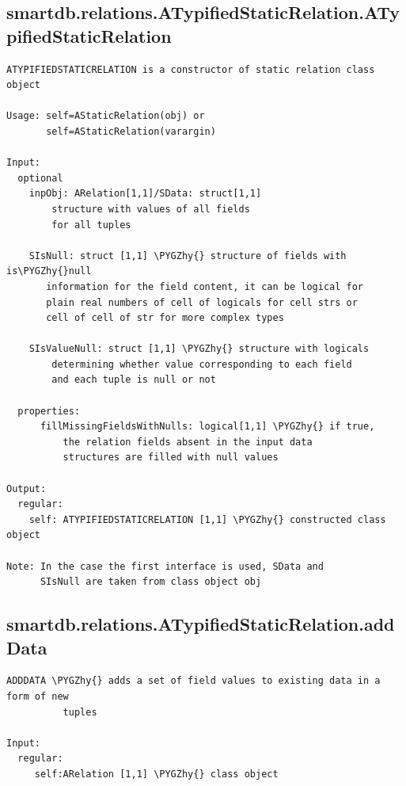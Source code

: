 \documentclass[letterpaper,10pt,english]{sphinxmanual}
\def\PYGZhy{\char`\-}
\begin{document}
\subsection{smartdb.relations.ATypifiedStaticRelation.ATypifiedStaticRelation}
\label{chap_functions:smartdb-relations-atypifiedstaticrelation-atypifiedstaticrelation}
\begin{Verbatim}[commandchars=\\\{\}]
ATYPIFIEDSTATICRELATION is a constructor of static relation class
object

Usage: self=AStaticRelation(obj) or
       self=AStaticRelation(varargin)

Input:
  optional
    inpObj: ARelation[1,1]/SData: struct[1,1]
        structure with values of all fields
        for all tuples

    SIsNull: struct [1,1] \PYGZhy{} structure of fields with is\PYGZhy{}null
       information for the field content, it can be logical for
       plain real numbers of cell of logicals for cell strs or
       cell of cell of str for more complex types

    SIsValueNull: struct [1,1] \PYGZhy{} structure with logicals
        determining whether value corresponding to each field
        and each tuple is null or not

  properties:
      fillMissingFieldsWithNulls: logical[1,1] \PYGZhy{} if true,
          the relation fields absent in the input data
          structures are filled with null values

Output:
  regular:
    self: ATYPIFIEDSTATICRELATION [1,1] \PYGZhy{} constructed class object

Note: In the case the first interface is used, SData and
      SIsNull are taken from class object obj
\end{Verbatim}


\subsection{smartdb.relations.ATypifiedStaticRelation.addData}
\label{chap_functions:smartdb-relations-atypifiedstaticrelation-adddata}
\begin{Verbatim}[commandchars=\\\{\}]
ADDDATA \PYGZhy{} adds a set of field values to existing data in a form of new
          tuples

Input:
  regular:
     self:ARelation [1,1] \PYGZhy{} class object
\end{Verbatim}
\end{document}
